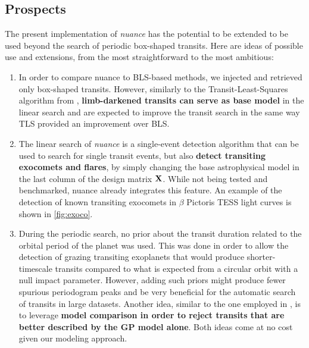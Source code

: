 \documentclass[modern,linenumbers]{aastex631}
\newcommand{\nuancemethod}{\textit{nuance}}
\newcommand{\nuancecode}{\textsf{nuance}}
\newcommand{\review}[1]{#1}
\begin{document}
\subsection{Prospects}
The present implementation of \nuancemethod{} has the potential to be extended to be used beyond the search of periodic box-shaped transits. Here are ideas of possible use and extensions, from the most straightforward to the most ambitious:
\begin{enumerate}
    \item In order to compare \nuancecode{} to BLS-based methods, we injected and retrieved only box-shaped transits. However, similarly to the Transit-Least-Squares algorithm from \cite{tls}, \textbf{limb-darkened transits can serve as base model} in the linear search and are expected to improve the transit search in the same way TLS provided an improvement over BLS.
    \item The linear search of \nuancemethod{} is a single-event detection algorithm that can be used to search for single transit events, but also \textbf{detect transiting exocomets and flares}, by simply changing the base astrophysical model in the last column of the design matrix $\bf{X}$. While not being tested and benchmarked, \nuancecode{} already integrates this feature. An example of the detection of known transiting exocomets in $\beta$ Pictoris TESS light curves is shown in \autoref{fig:exoco}.
    \item During the periodic search, no prior about the transit duration related to the orbital period of the planet was used. This was done in order to allow the detection of grazing transiting exoplanets that would produce \review{shorter-timescale}{} transits compared to what is expected from a circular orbit with a null impact parameter. However, adding such priors might produce fewer spurious periodogram peaks and be very beneficial for the automatic search of transits in large datasets. Another idea, similar to the one employed in \cite{foreman2016}, is to leverage \textbf{model comparison in order to reject transits that are better described by the GP model alone}. Both ideas come at no cost given our modeling approach.

\end{enumerate}
\end{document}
